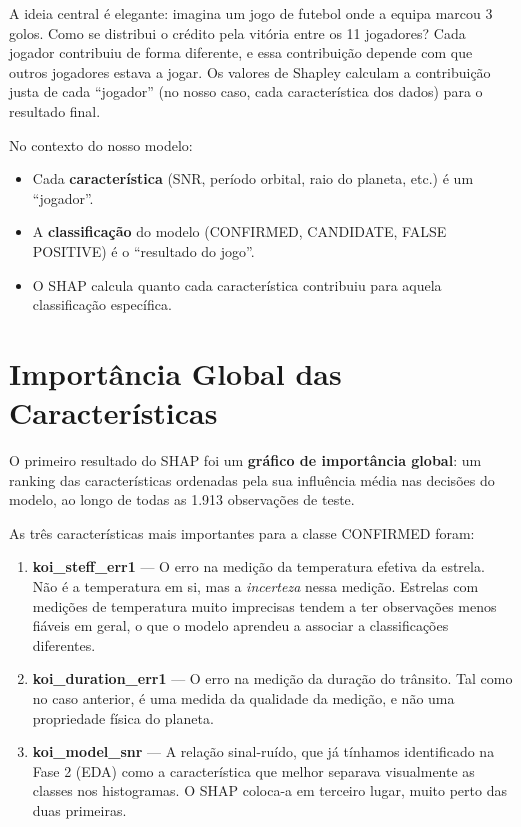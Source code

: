 \documentclass[12pt, a4paper]{report}
\begin{document}
A ideia central é elegante: imagina um jogo de futebol onde a equipa marcou 3 golos. Como se distribui o crédito pela vitória entre os 11 jogadores? Cada jogador contribuiu de forma diferente, e essa contribuição depende com que outros jogadores estava a jogar. Os valores de Shapley calculam a contribuição justa de cada ``jogador'' (no nosso caso, cada característica dos dados) para o resultado final.

No contexto do nosso modelo:
\begin{itemize}
    \item Cada \textbf{característica} (SNR, período orbital, raio do planeta, etc.) é um ``jogador''.
    \item A \textbf{classificação} do modelo (CONFIRMED, CANDIDATE, FALSE POSITIVE) é o ``resultado do jogo''.
    \item O SHAP calcula quanto cada característica contribuiu para aquela classificação específica.
\end{itemize}

\section{Importância Global das Características}

O primeiro resultado do SHAP foi um \textbf{gráfico de importância global}: um ranking das características ordenadas pela sua influência média nas decisões do modelo, ao longo de todas as 1.913 observações de teste.

As três características mais importantes para a classe CONFIRMED foram:

\begin{enumerate}
    \item \textbf{koi\_steff\_err1} — O erro na medição da temperatura efetiva da estrela. Não é a temperatura em si, mas a \textit{incerteza} nessa medição. Estrelas com medições de temperatura muito imprecisas tendem a ter observações menos fiáveis em geral, o que o modelo aprendeu a associar a classificações diferentes.

    \item \textbf{koi\_duration\_err1} — O erro na medição da duração do trânsito. Tal como no caso anterior, é uma medida da qualidade da medição, e não uma propriedade física do planeta.

    \item \textbf{koi\_model\_snr} — A relação sinal-ruído, que já tínhamos identificado na Fase 2 (EDA) como a característica que melhor separava visualmente as classes nos histogramas. O SHAP coloca-a em terceiro lugar, muito perto das duas primeiras.
\end{enumerate}
\end{document}
